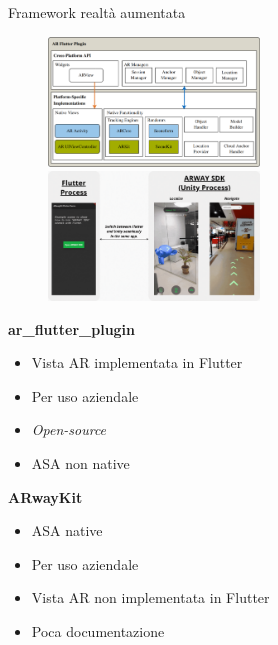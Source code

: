 \documentclass{beamer}
\begin{document}
\begin{frame}{Framework realtà aumentata}

 \begin{figure}
    \centering
    \includegraphics[width=0.5\textwidth]{immagini/carsius2.png}\vspace{.5em}
    \includegraphics[width=0.5\textwidth]{immagini/ARwayKit_samplegif_screenshot.png}
\end{figure}

\textbf{ar\_flutter\_plugin}
\begin{itemize}
    \item {} Vista AR implementata in Flutter
    \item {} Per uso aziendale
    \item {} \textit{Open-source}
    \item {} ASA non native
\end{itemize}

\textbf{ARwayKit}
\begin{itemize}
    \item {} ASA native 
    \item {} Per uso aziendale
    \item {} Vista AR non implementata in Flutter
    \item {} Poca documentazione
\end{itemize}

\vspace{3em}
\end{frame}
\end{document}
